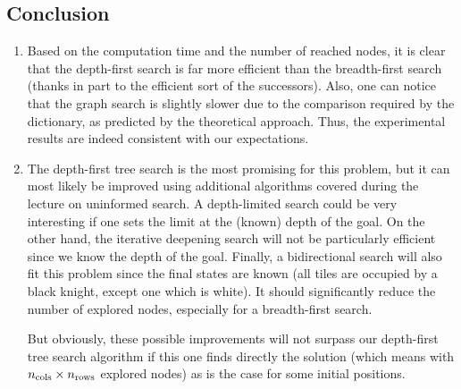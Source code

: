 \documentclass[journal]{IEEEtran}
\begin{document}
 \subsection{Conclusion}
 \begin{enumerate}
  \item Based on the computation time and the number of reached nodes, it is clear that the depth-first search is far more efficient than the breadth-first search (thanks in part to the efficient sort of the successors). Also, one can notice that the graph search is slightly slower due to the comparison required by the dictionary, as predicted by the theoretical approach.
  Thus, the experimental results are indeed consistent with our expectations.
  \item The depth-first tree search is the most promising for this problem, but it can most likely be improved using additional algorithms covered during the lecture on uninformed search.
  A depth-limited search could be very interesting if one sets the limit at the (known) depth of the goal.
  On the other hand, the iterative deepening search will not be particularly efficient since we know the depth of the goal.
  Finally, a bidirectional search will also fit this problem since the final states are known (all tiles are occupied by a black knight, except one which is white).
  It should significantly reduce the number of explored nodes, especially for a breadth-first search.
  
  But obviously, these possible improvements will not surpass our depth-first tree search algorithm if this one finds directly the solution (which means with \(n_{\textnormal{cols}} \times n_{\textnormal{\vphantom{l}rows}}\) explored nodes) as is the case for some initial positions.
 \end{enumerate}
\end{document}
